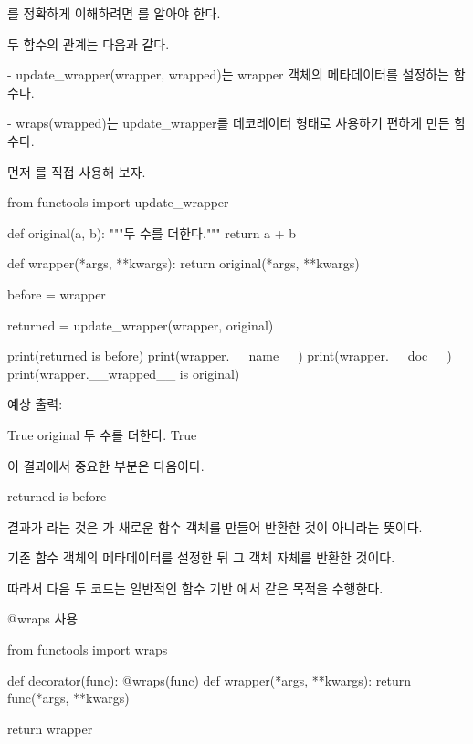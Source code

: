 를 정확하게 이해하려면 를 알아야 한다.

두 함수의 관계는 다음과 같다.

\begin{dhksmry}
- update_wrapper(wrapper, wrapped)는 wrapper 객체의 메타데이터를
  설정하는 함수다.

- wraps(wrapped)는 update_wrapper를 데코레이터 형태로 사용하기
  편하게 만든 함수다.
\end{dhksmry}

먼저 를 직접 사용해 보자.

\begin{dhkcode}
from functools import update_wrapper

def original(a, b):
    """두 수를 더한다."""
    return a + b


def wrapper(*args, **kwargs):
    return original(*args, **kwargs)


before = wrapper

returned = update_wrapper(wrapper, original)

print(returned is before)
print(wrapper.__name__)
print(wrapper.__doc__)
print(wrapper.__wrapped__ is original)
\end{dhkcode}

예상 출력:

\begin{dhkzsh}
True
original
두 수를 더한다.
True
\end{dhkzsh}

이 결과에서 중요한 부분은 다음이다.

\begin{dhkcode}
returned is before
\end{dhkcode}

결과가 라는 것은 가 새로운  함수 객체를 만들어 반환한 것이 아니라는 뜻이다.

기존  함수 객체의 메타데이터를 설정한 뒤 그 객체 자체를 반환한 것이다.

따라서 다음 두 코드는 일반적인 함수 기반 에서 같은 목적을 수행한다.

\begin{dhknote}
\begin{dhksmry}[centered]
@wraps 사용
\end{dhksmry}
\end{dhknote}

\begin{dhkcode}
from functools import wraps

def decorator(func):
    @wraps(func)
    def wrapper(*args, **kwargs):
        return func(*args, **kwargs)

    return wrapper
\end{dhkcode}

